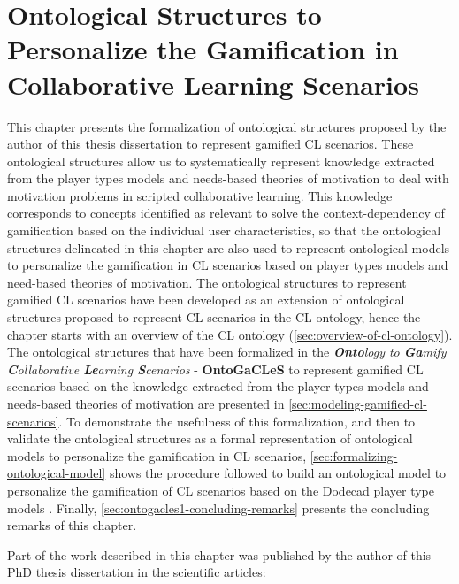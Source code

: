 
\chapter[Ontological Structures to Personalize the Gamification in CL Scenarios]{Ontological Structures to Personalize the Gamification in Collaborative Learning Scenarios}
\label{chapter:ontogacles-1}

This chapter presents the formalization of ontological structures proposed by the author of this thesis dissertation to represent gamified CL scenarios.
These ontological structures allow us to systematically represent knowledge extracted from the player types models and needs-based theories of motivation to deal with motivation problems in scripted collaborative learning.
This knowledge corresponds to concepts identified as relevant to solve the context-dependency of gamification based on the individual user characteristics, so that the ontological structures delineated in this chapter are also used to represent ontological models to personalize the gamification in CL scenarios based on player types models and need-based theories of motivation.
The ontological structures to represent gamified CL scenarios have been developed as an extension of ontological structures proposed to represent CL scenarios in the CL ontology, hence the chapter starts with an overview of the CL ontology (\autoref{sec:overview-of-cl-ontology}).
The ontological structures that have been formalized in the \emph{\textbf{Onto}logy to \textbf{Ga}mify \textbf{C}ollaborative \textbf{Le}arning \textbf{S}cenarios} - \textbf{OntoGaCLeS} to represent gamified CL scenarios based on the knowledge extracted from the player types models and needs-based theories of motivation are presented in \autoref{sec:modeling-gamified-cl-scenarios}.
To demonstrate the usefulness of this formalization, and then to validate the ontological structures as a formal representation of ontological models to personalize the gamification in CL scenarios, \autoref{sec:formalizing-ontological-model} shows the procedure followed to build an ontological model to personalize the gamification of CL scenarios based on the Dodecad player type models \cite{Marczewski2015b}.
Finally, \autoref{sec:ontogacles1-concluding-remarks} presents the concluding remarks of this chapter.

Part of the work described in this chapter was published by the author of this PhD thesis dissertation in the scientific articles:

